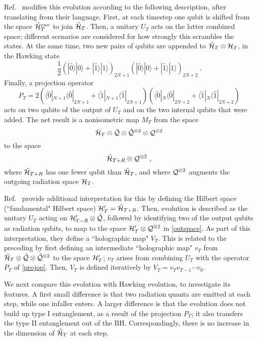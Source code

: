 \documentclass[11pt]{article}
\numberwithin{equation}{section}
\newcommand{\calh}{{\cal H}}
\newcommand{\calq}{{\cal Q}}
\newcommand{\beq}{\begin{equation}}
\newcommand{\eeq}{\end{equation}}
\begin{document}
Ref.~\cite{AEHPV} modifies this evolution according to the following description, after translating from their language.  First, at each timestep one qubit is shifted from the space $\tilde \calh^{env}_T$ to join $\tilde \calh_T$. 
Then, a unitary $U_T$ acts on the latter combined space; different scenarios are considered for how strongly this scrambles the states.  At the same time, two new pairs of qubits are appended to 
$\hat\calh_T\otimes \calh_T$,
in the Hawking state 
\beq
\frac{1}{2} \left(|\hat 0\rangle |0\rangle + |\hat 1\rangle |1\rangle\right)_{2N+1}\left(|\hat 0\rangle |0\rangle + |\hat 1\rangle |1\rangle\right)_{2N+2}\ .
\eeq
Finally, a projection operator 
\beq\label{projop}
P_T=2\left( \langle \tilde 0|_{N+1} \langle \hat 0|_{2N+1} +\langle \tilde 1|_{N+1} \langle \hat 1|_{2N+1} \right) \left( \langle \tilde 0|_{N} \langle \hat 0|_{2N+2}+ \langle \tilde 1|_{N} \langle \hat 1|_{2N+2}\right)
\eeq
acts on two qubits of the output of $U_T$ and on the two internal qubits that were added.  The net result is a nonisometric map $M_T$ from the space
\beq
 \tilde \calh_T   \otimes \tilde \calq \otimes \hat \calq^{\otimes 2}  \otimes \calq^{\otimes 2}
\eeq
to the space
\beq\label{outspace}
 \tilde \calh_{T+R} \otimes  \calq^{\otimes 2}\ ,
 \eeq
 where $ \tilde \calh_{T+R} $ has one fewer qubit than $\tilde \calh_T$, and where $\calq^{\otimes 2}$ augments the outgoing radiation space $\calh_T$.  

Ref.~\cite{AEHPV} provide additional interpretation for this by defining the Hilbert space (``fundamental" Hilbert space) $\calh_T'= \tilde \calh_{T+R}$.  
Then, evolution is described as the unitary $U_T$ acting on $\calh_{T-R}'\otimes \tilde \calq$, followed by identifying two of the output qubits as radiation qubits, to map to the space $\calh'_T\otimes \calq^{\otimes 2}$ in \eqref{outspace}.  As part of this interpretation, they define a ``holographic map" $V_T$.  This is related to the preceding by first defining an intermediate ``holographic map" $v_T$ from $\tilde \calh_T   \otimes \tilde \calq \otimes \hat \calq^{\otimes 2}$ to the space $\calh'_{T}$;  $v_T$ arises from combining $U_T$ with the operator $P_T$ of \eqref{projop}.  
Then, $V_T$ is defined iteratively by $V_T=v_T v_{T-1}\cdots v_0$.  

We next compare this evolution with Hawking evolution, to investigate its features.  A first small difference is that two radiation quanta are emitted at each step, while one infaller enters.  
A larger difference is that the evolution does not build up type I entanglement, as a result of the projection $P_T$; it also transfers the type II entanglement out of the BH.  Correspondingly, there is no increase in the dimension of $\hat \calh_T$ at each step.
\end{document}
